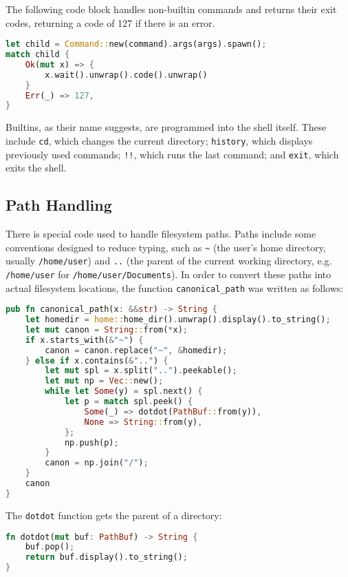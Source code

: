 \documentclass[12pt,twoside]{report} %
\begin{document}
	The following code block handles non-builtin commands and returns their exit codes, returning a code of 127 if there is an error.

	\lstset{style=boxed}
	\begin{lstlisting}[language=Rust,caption={General code to execute commands}]
let child = Command::new(command).args(args).spawn();
match child {
    Ok(mut x) => {
        x.wait().unwrap().code().unwrap()
    }
    Err(_) => 127,
}\end{lstlisting}

	Builtins, as their name suggests, are programmed into the shell itself. These include \verb|cd|, which changes the current directory; \verb|history|, which displays previously used commands; \verb|!!|, which runs the last command; and \verb|exit|, which exits the shell.
	
	\subsection{Path Handling} \label{sec:path-handling}
	There is special code used to handle filesystem paths. Paths include some conventions designed to reduce typing, such as \verb|~| (the user's home directory, usually \verb|/home/user|) and \verb|..| (the parent of the current working directory, e.g. \verb|/home/user| for \verb|/home/user/Documents|). In order to convert these paths into actual filesystem locations, the function \verb|canonical_path| was written as follows:
	
	\begin{lstlisting}[language=Rust, caption={Code to canonicalize paths},breaklines=true]
pub fn canonical_path(x: &&str) -> String {
    let homedir = home::home_dir().unwrap().display().to_string();
    let mut canon = String::from(*x);
    if x.starts_with(&"~") {
        canon = canon.replace("~", &homedir);
    } else if x.contains(&"..") {
        let mut spl = x.split("..").peekable();
        let mut np = Vec::new();
        while let Some(y) = spl.next() {
            let p = match spl.peek() {
                Some(_) => dotdot(PathBuf::from(y)),
                None => String::from(y),
            };
            np.push(p);
        }
        canon = np.join("/");
    }
    canon
}\end{lstlisting}
	
	The \verb|dotdot| function gets the parent of a directory:
	
	\begin{lstlisting}[language=Rust,caption={Code to get parent of directory}]
fn dotdot(mut buf: PathBuf) -> String {
    buf.pop();
    return buf.display().to_string();
}\end{lstlisting}
\end{document}
